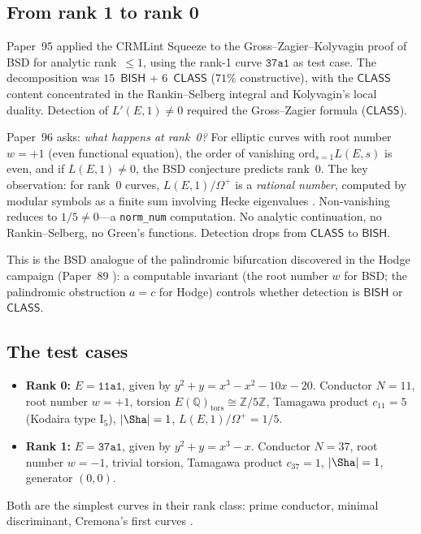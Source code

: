 \documentclass[11pt]{article}
\theoremstyle{plain}
\theoremstyle{definition}
\theoremstyle{remark}
\newcommand{\Z}{\mathbb{Z}}
\newcommand{\Q}{\mathbb{Q}}
\newcommand{\ord}{\mathrm{ord}}
\newcommand{\BISH}{\ensuremath{\mathsf{BISH}}}
\newcommand{\CLASS}{\ensuremath{\mathsf{CLASS}}}
\begin{document}
\subsection{From rank 1 to rank 0}

Paper~95 \cite{paper95} applied the CRMLint Squeeze to the Gross--Zagier--Kolyvagin proof of BSD for analytic rank~$\leq 1$, using the rank-1 curve $\texttt{37a1}$ as test case. The decomposition was $15$~$\BISH$ + $6$~$\CLASS$ ($71\%$ constructive), with the $\CLASS$ content concentrated in the Rankin--Selberg integral and Kolyvagin's local duality. Detection of $L'(E,1) \neq 0$ required the Gross--Zagier formula ($\CLASS$).

Paper~96 asks: \emph{what happens at rank~0?} For elliptic curves with root number $w = +1$ (even functional equation), the order of vanishing $\ord_{s=1} L(E,s)$ is even, and if $L(E,1) \neq 0$, the BSD conjecture predicts rank~0. The key observation: for rank~0 curves, $L(E,1)/\Omega^+$ is a \emph{rational number}, computed by modular symbols as a finite sum involving Hecke eigenvalues \cite{cremona,manin}. Non-vanishing reduces to $1/5 \neq 0$---a \texttt{norm\_num} computation. No analytic continuation, no Rankin--Selberg, no Green's functions. Detection drops from $\CLASS$ to $\BISH$.

This is the BSD analogue of the palindromic bifurcation discovered in the Hodge campaign (Paper~89 \cite{paper89}): a computable invariant (the root number $w$ for BSD; the palindromic obstruction $a = c$ for Hodge) controls whether detection is $\BISH$ or $\CLASS$.

\subsection{The test cases}

\begin{itemize}[nosep]
\item \textbf{Rank 0:} $E = \texttt{11a1}$, given by $y^2 + y = x^3 - x^2 - 10x - 20$. Conductor $N = 11$, root number $w = +1$, torsion $E(\Q)_{\mathrm{tors}} \cong \Z/5\Z$, Tamagawa product $c_{11} = 5$ (Kodaira type $\mathrm{I}_5$), $|\Sha| = 1$, $L(E,1)/\Omega^+ = 1/5$.
\item \textbf{Rank 1:} $E = \texttt{37a1}$, given by $y^2 + y = x^3 - x$. Conductor $N = 37$, root number $w = -1$, trivial torsion, Tamagawa product $c_{37} = 1$, $|\Sha| = 1$, generator $(0,0)$.
\end{itemize}

Both are the simplest curves in their rank class: prime conductor, minimal discriminant, Cremona's first curves \cite{cremona,lmfdb}.
\end{document}
